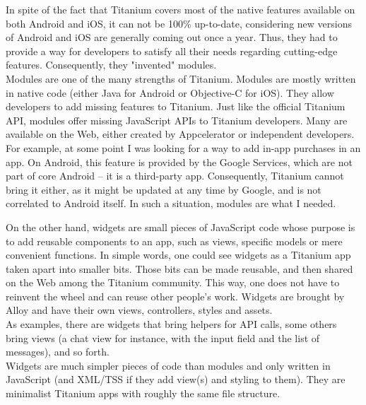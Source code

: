 In spite of the fact that Titanium covers most of the native features available on both Android and iOS, it can not be 100\% up-to-date, considering new versions of Android and iOS are generally coming out once a year. Thus, they had to provide a way for developers to satisfy all their needs regarding cutting-edge features. Consequently, they "invented" modules.\\
Modules are one of the many strengths of Titanium. Modules are mostly written in native code (either Java for Android or Objective-C for iOS). They allow developers to add missing features to Titanium. Just like the official Titanium API, modules offer missing JavaScript APIs to Titanium developers. Many are available on the Web, either created by Appcelerator or independent developers.\\
For example, at some point I was looking for a way to add in-app purchases in an app. On Android, this feature is provided by the Google Services, which are not part of core Android -- it is a third-party app. Consequently, Titanium cannot bring it either, as it might be updated at any time by Google, and is not correlated to Android itself. In such a situation, modules are what I needed.

\medskip

On the other hand, widgets are small pieces of JavaScript code whose purpose is to add reusable components to an app, such as views, specific models or mere convenient functions. In simple words, one could see widgets as a Titanium app taken apart into smaller bits. Those bits can be made reusable, and then shared on the Web among the Titanium community. This way, one does not have to reinvent the wheel and can reuse other people's work. Widgets are brought by Alloy and have their own views, controllers, styles and assets.\\
As examples, there are widgets that bring helpers for API calls, some others bring views (a chat view for instance, with the input field and the list of messages), and so forth.\\
Widgets are much simpler pieces of code than modules and only written in JavaScript (and XML/TSS if they add view(s) and styling to them). They are minimalist Titanium apps with roughly the same file structure.

\medskip

